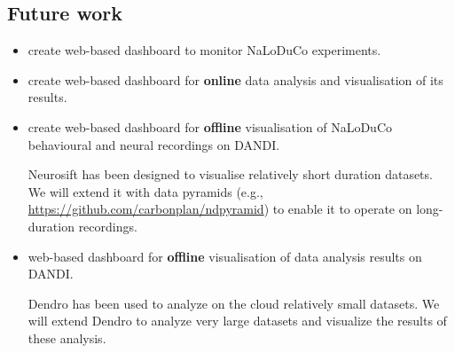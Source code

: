 \subsection{Future work}

\begin{itemize}

    \item create web-based dashboard to monitor NaLoDuCo experiments.

    \item create web-based dashboard for \textbf{online} data analysis and
    visualisation of its results.

    \item create web-based dashboard for \textbf{offline} visualisation of NaLoDuCo
    behavioural and neural recordings on DANDI.

    Neurosift has been designed to visualise relatively short duration
    datasets. We will extend it with data pyramids (e.g.,
    \url{https://github.com/carbonplan/ndpyramid}) to enable it to operate on
    long-duration recordings.

    \item web-based dashboard for \textbf{offline} visualisation of data analysis
    results on DANDI.

    Dendro has been used to analyze on the cloud relatively small datasets. We
    will extend Dendro to analyze very large datasets and visualize the results
    of these analysis.

\end{itemize}

